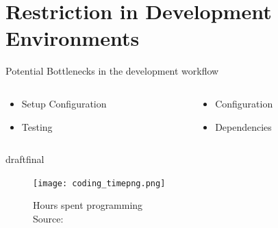 \documentclass{beamer}
\def\final{final}
\def\status{draft}
\begin{document}
\section{Restriction in Development Environments}
\begin{frame}{}
  \begin{center}
    \large{\color{uos-red-full} Potential Bottlenecks in the development workflow}
    \normalsize
    \vspace{0.5cm}
    \begin{columns}[totalwidth=\textwidth]
      \begin{column}{0.4\textwidth}
        \begin{itemize}
          \item Setup Configuration
          \item Testing
        \end{itemize}
      \end{column}
      \begin{column}{0.4\textwidth}
        \begin{itemize}
          \item Configuration
          \item Dependencies
        \end{itemize}
      \end{column}
    \end{columns}
  \end{center}

  \ifx\status\final{}
    \pause{}
  \fi

  \begin{figure}
    \texttt{[image: coding\_timepng.png]}
    \caption{\footnotesize Hours spent programming \\\textcolor{uos-grey-full}{Source: {\cite{setuppain}}}}
  \end{figure}
\end{frame}

\end{document}

